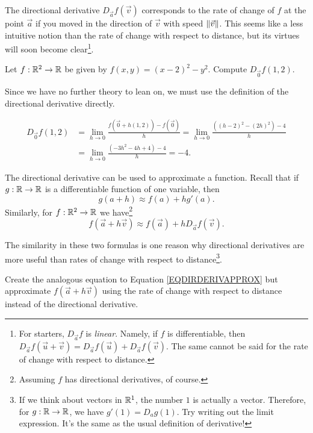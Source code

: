 The directional derivative $D_{\vec a}f(\vec v)$ corresponds to the rate of change of $f$ at the point $\vec a$
if you moved in the direction of $\vec v$ with speed $\lVert\vec v\rVert$.  This seems 
like a less intuitive notion than the rate of change with respect to distance, but its virtues will
soon become clear\footnote{ For starters, $D_{\vec a}f$ is \emph{linear}.  Namely, if $f$ is differentiable,
then $D_{\vec a}f(\vec u+\vec v)=D_{\vec a}f(\vec u)+D_{\vec a}f(\vec v)$.  The same cannot
be said for the rate of change with respect to distance.}.

\begin{example}
	Let $f:\mathbb{R}^2\to\mathbb{R}$ be given by $f(x,y)=(x-2)^2-y^2$.  Compute $D_{\vec 0}f(1,2)$.

	Since we have no further theory to lean on, we must use the definition of the directional
	derivative directly.

	\begin{align*}
		D_{\vec 0}f(1,2) &= \lim_{h\to0}\frac{f(\vec 0+h(1,2))-f(\vec 0)}{h}
		=\lim_{h\to0}\frac{((h-2)^2-(2h)^2)-4}{h}\\
		&=\lim_{h\to0}\frac{(-3h^2-4h+4)-4}{h}=-4.
	\end{align*}
\end{example}

The directional derivative can be used to approximate a function.  Recall that if $g:\mathbb{R}\to\mathbb{R}$ is
a differentiable function of one variable, then
\[
	g(a+h)\approx f(a) + hg'(a).
\]
Similarly, for $f:\mathbb{R}^2\to\mathbb{R}$ we have\footnote{ Assuming $f$ has directional derivatives, of course.}
\begin{equation}
	\label{EQDIRDERIVAPPROX}
	f(\vec a+h\vec v)\approx f(\vec a)+hD_{\vec a}f(\vec v).
\end{equation}

The similarity in these two formulas is one reason
why directional derivatives are more useful than rates of change with respect to distance\footnote{
	If we think about vectors in $\mathbb{R}^1$, the number $1$ is actually a vector.  Therefore,
	for $g:\mathbb{R}\to\mathbb{R}$, we have $g'(1)=D_{a}g(1)$.  Try writing out the limit expression.  It's the same
	as the usual definition of derivative!
	}.

\begin{exercise}
	Create the analogous equation to Equation \eqref{EQDIRDERIVAPPROX} but approximate
	$f(\vec a+h\vec v)$ using the rate of change with respect to distance instead of the
	directional derivative.
\end{exercise}


